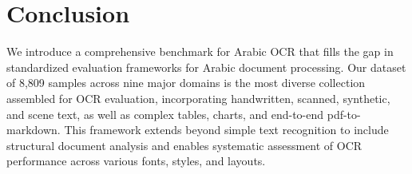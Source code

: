 \section{Conclusion}

We introduce a comprehensive benchmark for Arabic OCR that fills the gap in standardized evaluation frameworks for Arabic document processing. Our dataset of 8,809 samples across nine major domains is the most diverse collection assembled for OCR evaluation, incorporating handwritten, scanned, synthetic, and scene text, as well as complex tables, charts, and end-to-end pdf-to-markdown. This framework extends beyond simple text recognition to include structural document analysis and enables systematic assessment of OCR performance across various fonts, styles, and layouts.

